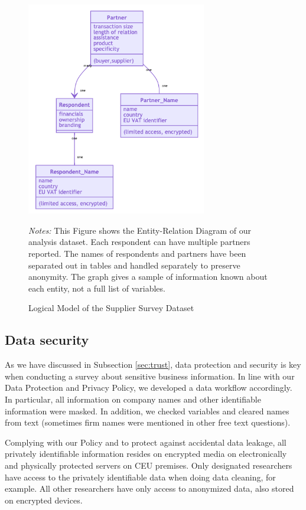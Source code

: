 \documentclass[final, dvipsnames, authoryear,12pt]{elsarticle}
\begin{document}
\begin{figure}[!h]
    \caption{Logical Model of the Supplier Survey Dataset}
    \label{fig:ERD} 
    \begin{center}    
    \includegraphics[width=0.7\textwidth]{graphs/ERD.png}
     \end{center}    
        {\footnotesize \textit{Notes:} This Figure shows the Entity-Relation Diagram of our analysis dataset. Each respondent can have multiple partners reported. The names of respondents and partners have been separated out in tables and handled separately to preserve anonymity. The graph gives a sample of information known about each entity, not a full list of variables.} 
\end{figure}

\subsection{Data security} 

As we have discussed in Subsection \ref{sec:trust}, data protection and security is key when conducting a survey about sensitive business information. In line with our Data Protection and Privacy Policy, we developed a data workflow accordingly. In particular, all information on company names and other identifiable information were masked. In addition, we checked variables and cleared names from text (sometimes firm names were mentioned in other free text questions).

Complying with our Policy and to protect against accidental data leakage, all privately identifiable information resides on encrypted media on electronically and physically protected servers on CEU premises. Only designated researchers have access to the privately identifiable data when doing data cleaning, for example. All other researchers have only access to anonymized data, also stored on encrypted devices.
\end{document}
